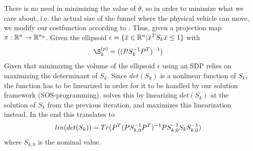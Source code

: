 There is no need in minimizing the value of \(\dot{\theta}\), so in order to
minimize what we care about, i.e. the actual size of the funnel where the
physical vehicle can move, we modify our costfunction according to
\cite{majumdarFunnelLibrariesRealtime2017}. Thus, given a projection map \(\pi :
\mathbb{R}^n \rightarrow \mathbb{R}^{n_p}\). Given the ellipsoid \(\epsilon = \lbrace\bar{x} \in
  \mathbb{R}^n | \bar{x}^TS_{k}\bar{x} \leq 1\rbrace\) with
\[
  \S_k^{(p)} = (\p{PS_k^{-1}P^T}^{-1})
\]
Given that minimizing the volume of the ellipsoid \(\epsilon\) using an SDP
relies on maximizing the determinant of \(S_k\). Since \(det(S_k)\) is a
nonlinear function of \(S_k\), the function has to be linearized in order for it
to be handled by our solution framework (SOS-programming).
\cite{majumdarFunnelLibrariesRealtime2017} solves this by linearizing
\(det(S_k)\) at the solution of \(S_k\) from the previous iteration, and
maximizes this linearization instead. In the end this translates to
\[
  lin\lparen det\lparen S_k\rparen\rparen = Tr\lparen P^T\lparen PS_{k,0}^{-1}P^T\rparen^{-1}PS_{k,0}^{-1}S_kS_{k,0}^{-1}\rparen
\]
where \(S_{k,0}\) is the nominal value.
